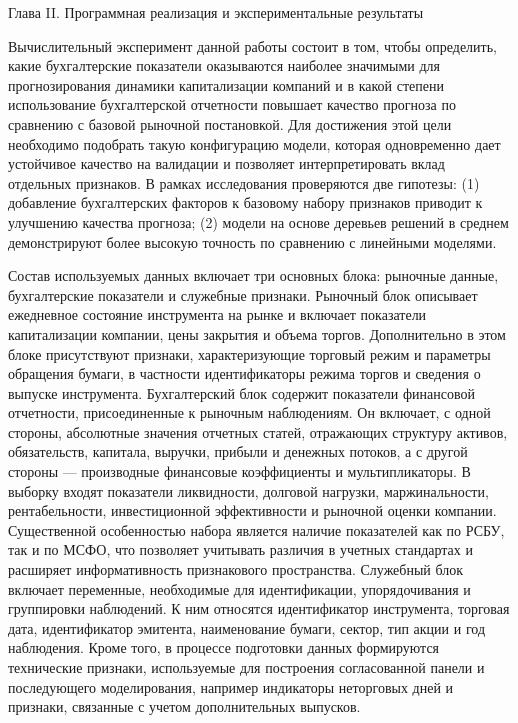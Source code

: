 \documentclass[
]{article}
\begin{document}
Глава II. Программная реализация и экспериментальные результаты

Вычислительный эксперимент данной работы состоит в том, чтобы определить, какие бухгалтерские показатели оказываются наиболее значимыми для прогнозирования динамики капитализации компаний и в какой степени использование бухгалтерской отчетности повышает качество прогноза по сравнению с базовой рыночной постановкой. Для достижения этой цели необходимо подобрать такую конфигурацию модели, которая одновременно дает устойчивое качество на валидации и позволяет интерпретировать вклад отдельных признаков. В рамках исследования проверяются две гипотезы: (1) добавление бухгалтерских факторов к базовому набору признаков приводит к улучшению качества прогноза; (2) модели на основе деревьев решений в среднем демонстрируют более высокую точность по сравнению с линейными моделями.

Состав используемых данных включает три основных блока: рыночные данные, бухгалтерские показатели и служебные признаки. Рыночный блок описывает ежедневное состояние инструмента на рынке и включает показатели капитализации компании, цены закрытия и объема торгов. Дополнительно в этом блоке присутствуют признаки, характеризующие торговый режим и параметры обращения бумаги, в частности идентификаторы режима торгов и сведения о выпуске инструмента. Бухгалтерский блок содержит показатели финансовой отчетности, присоединенные к рыночным наблюдениям. Он включает, с одной стороны, абсолютные значения отчетных статей, отражающих структуру активов, обязательств, капитала, выручки, прибыли и денежных потоков, а с другой стороны --- производные финансовые коэффициенты и мультипликаторы. В выборку входят показатели ликвидности, долговой нагрузки, маржинальности, рентабельности, инвестиционной эффективности и рыночной оценки компании. Существенной особенностью набора является наличие показателей как по РСБУ, так и по МСФО, что позволяет учитывать различия в учетных стандартах и расширяет информативность признакового пространства. Служебный блок включает переменные, необходимые для идентификации, упорядочивания и группировки наблюдений. К ним относятся идентификатор инструмента, торговая дата, идентификатор эмитента, наименование бумаги, сектор, тип акции и год наблюдения. Кроме того, в процессе подготовки данных формируются технические признаки, используемые для построения согласованной панели и последующего моделирования, например индикаторы неторговых дней и признаки, связанные с учетом дополнительных выпусков.
\end{document}
